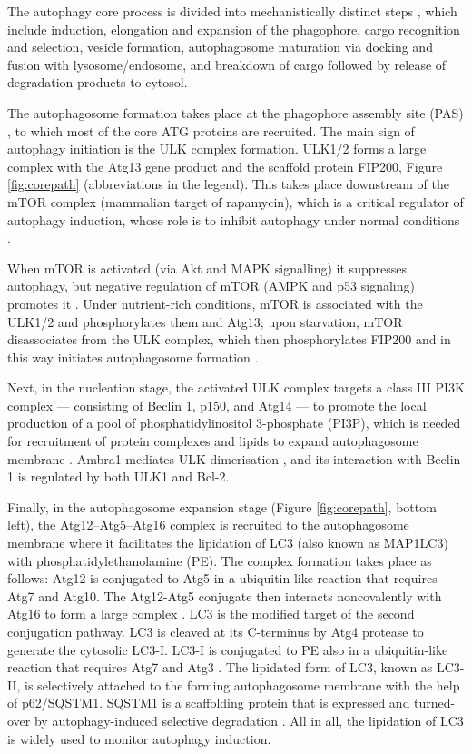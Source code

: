     The autophagy core process is divided into mechanistically distinct steps \cite{He2009}, which include induction, elongation and expansion of the phagophore, cargo recognition and selection, vesicle formation, autophagosome maturation via docking and fusion with lysosome/endosome, and breakdown of cargo followed by release of degradation products to cytosol.
    
    The autophagosome formation takes place at the phagophore assembly site (PAS) \cite{kim2002con}, to which most of the core ATG proteins are recruited. The main sign of autophagy initiation is the ULK complex formation. ULK1/2 forms a large complex with the Atg13 gene product and the scaffold protein FIP200, Figure \ref{fig:corepath} (abbreviations in the legend). This takes place downstream of the mTOR complex (mammalian target of rapamycin), which is a critical regulator of autophagy induction, whose role is to inhibit autophagy under normal conditions \cite{Zoncu2011MTOR:Ageing}.  
    
    When mTOR is activated (via Akt and MAPK signalling) it suppresses autophagy, but negative regulation of mTOR (AMPK and p53 signaling) promotes it \cite{Yang2010}. Under nutrient-rich conditions, mTOR is associated with the ULK1/2  and phosphorylates them and Atg13; upon starvation, mTOR disassociates from the ULK complex, which then phosphorylates FIP200 and in this way initiates autophagosome formation \cite{lamb2013}. 
    
    Next, in the nucleation stage, the activated ULK complex targets a class III PI3K complex — consisting of Beclin 1, p150, and Atg14 — to promote the local production of a pool of phosphatidylinositol 3-phosphate (PI3P), which is needed for recruitment of protein complexes and lipids to expand autophagosome membrane \cite{Kaur2015, Zhou2015}. Ambra1 mediates ULK dimerisation \cite{Nazio2013MTORTRAF6}, and its interaction with Beclin 1 is regulated by both ULK1 and Bcl-2.
    
    Finally, in the autophagosome expansion stage (Figure \ref{fig:corepath}, bottom left), the Atg12–Atg5–Atg16 complex is recruited to the autophagosome membrane where it facilitates the lipidation of LC3 (also known as MAP1LC3) with phosphatidylethanolamine (PE). The complex formation takes place as follows:  Atg12 is conjugated to Atg5 in a ubiquitin-like reaction that requires Atg7 and Atg10. The Atg12-Atg5 conjugate then interacts noncovalently with Atg16 to form a large complex \cite{He2009}.
    LC3 is the modified target of the second conjugation pathway. LC3 is cleaved at its C-terminus by Atg4 protease to generate the cytosolic LC3-I. LC3-I is conjugated to PE also in a ubiquitin-like reaction that requires Atg7 and Atg3 \cite{He2009}. The lipidated form of LC3, known as LC3-II, is selectively attached to the forming autophagosome membrane with the help of p62/SQSTM1. SQSTM1 is a scaffolding protein that is expressed and turned-over by autophagy-induced selective degradation \cite{Zhou2015}. All in all, the lipidation of LC3 is widely used to monitor autophagy induction. 
 
